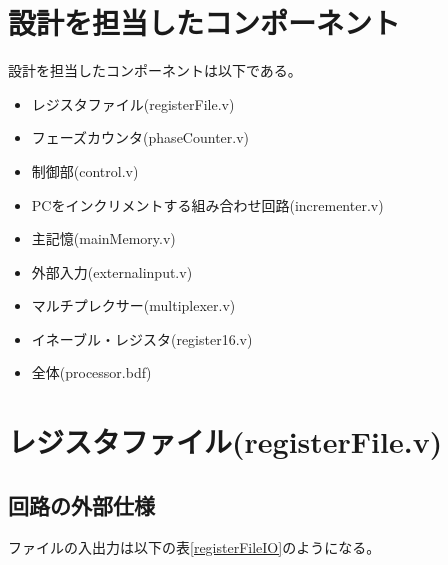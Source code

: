 \documentclass[a4j,titlepage]{jarticle}
\begin{document}
\section{設計を担当したコンポーネント}
設計を担当したコンポーネントは以下である。
\begin{itemize}
    \item レジスタファイル(registerFile.v)
    \item フェーズカウンタ(phaseCounter.v)
    \item 制御部(control.v)
    \item PCをインクリメントする組み合わせ回路(incrementer.v)
    \item 主記憶(mainMemory.v)
    \item 外部入力(externalinput.v)
    \item マルチプレクサー(multiplexer.v)
    \item イネーブル・レジスタ(register16.v)
    \item 全体(processor.bdf)
\end{itemize}



\section{レジスタファイル(registerFile.v)}

\subsection{回路の外部仕様}
ファイルの入出力は以下の表\ref{registerFileIO}のようになる。
\end{document}
